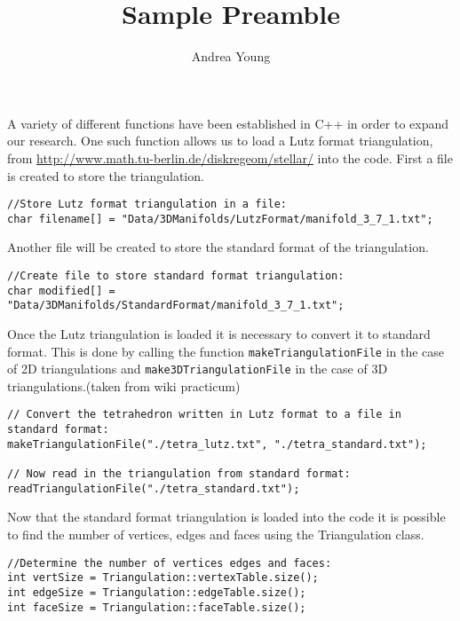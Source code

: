 \documentclass{amsart}
\title{Sample Preamble}
\author{Andrea Young}
\theoremstyle{plain}
\numberwithin{equation}{section}
\begin{document}
\maketitle

A variety of different functions have been established in C++ in order to expand our research.  One such function allows us to load a Lutz format triangulation, from \url{http://www.math.tu-berlin.de/diskregeom/stellar/} into the code. First a file is created to store the triangulation.\newline

\begin{verbatim}
//Store Lutz format triangulation in a file:
char filename[] = "Data/3DManifolds/LutzFormat/manifold_3_7_1.txt";

\end{verbatim} 

\noindent Another file will be created to store the standard format of the triangulation.\newline
 
\begin{verbatim}
//Create file to store standard format triangulation:
char modified[] = "Data/3DManifolds/StandardFormat/manifold_3_7_1.txt";

\end{verbatim} 

\noindent Once the Lutz triangulation is loaded it is necessary to convert it to standard format.  This is done by calling the function \verb=makeTriangulationFile= in the case of 2D triangulations and \verb=make3DTriangulationFile= in the case of 3D triangulations.(taken from wiki practicum)\newline

\begin{verbatim}
// Convert the tetrahedron written in Lutz format to a file in standard format:
makeTriangulationFile("./tetra_lutz.txt", "./tetra_standard.txt");

// Now read in the triangulation from standard format:
readTriangulationFile("./tetra_standard.txt");

\end{verbatim} 

Now that the standard format triangulation is loaded into the code it is possible to find the number of vertices, edges and faces using the Triangulation class.\newline

\begin{verbatim}
//Determine the number of vertices edges and faces:
int vertSize = Triangulation::vertexTable.size();
int edgeSize = Triangulation::edgeTable.size();
int faceSize = Triangulation::faceTable.size();

\end{verbatim} 
\end{document}
